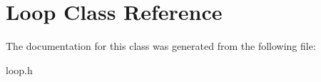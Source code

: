 \hypertarget{class_loop}{}\section{Loop Class Reference}
\label{class_loop}


The documentation for this class was generated from the following file\+:\begin{DoxyCompactItemize}
\item 
loop.\+h\end{DoxyCompactItemize}
